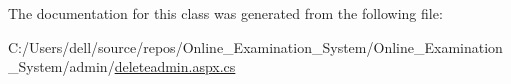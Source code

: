 The documentation for this class was generated from the following file\+:\begin{DoxyCompactItemize}
\item 
C\+:/\+Users/dell/source/repos/\+Online\+\_\+\+Examination\+\_\+\+System/\+Online\+\_\+\+Examination\+\_\+\+System/admin/\mbox{\hyperlink{deleteadmin_8aspx_8cs}{deleteadmin.\+aspx.\+cs}}\end{DoxyCompactItemize}
